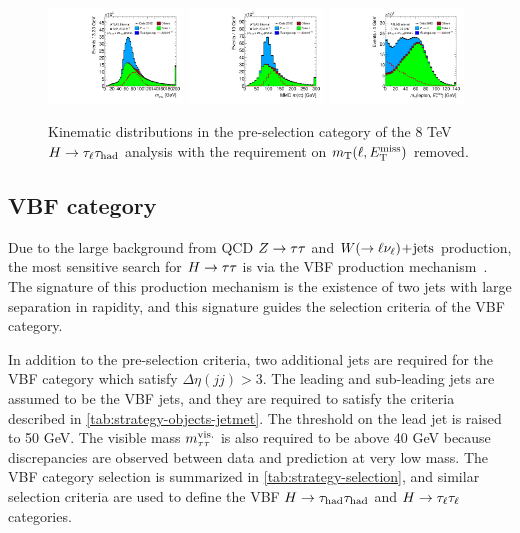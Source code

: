 \begin{figure}[tp]
  \includegraphics[width=0.32\textwidth]{figures/presel/mvis}
  \includegraphics[width=0.32\textwidth]{figures/presel/mMMC}
  \includegraphics[width=0.32\textwidth]{figures/presel/mT-hi} \\
  \caption{Kinematic distributions in the pre-selection category of the 8 TeV $H\rightarrow\tau_\ell\tau_\text{had}$ analysis with the requirement on $m_\text{T}(\ell, E_{\mathrm{T}}^{\mathrm{miss}})$ removed.}
  \label{fig:stategy-presel-2}
\end{figure}

\subsection{VBF category}
\label{sec:strategy-VBF}

Due to the large background from QCD $Z\rightarrow\tau\tau$ and $W (\rightarrow \ell\nu_\ell)\!+\!\text{jets}$ production, the most sensitive search for $H\rightarrow\tau\tau$ is via the VBF production mechanism~\cite{1998.vbfhtautau}. The signature of this production mechanism is the existence of two jets with large separation in rapidity, and this signature guides the selection criteria of the VBF category.

In addition to the pre-selection criteria, two additional jets are required for the VBF category which satisfy $\Delta\eta(jj) > 3$. The leading and sub-leading jets are assumed to be the VBF jets, and they are required to satisfy the criteria described in \cref{tab:strategy-objects-jetmet}. The threshold on the lead jet is raised to 50 GeV. The visible mass $m_{\tau\tau}^\text{vis.}$ is also required to be above 40 GeV because discrepancies are observed between data and prediction at very low mass. The VBF category selection is summarized in \cref{tab:strategy-selection}, and similar selection criteria are used to define the VBF $H\rightarrow\tau_\text{had}\tau_\text{had}$ and $H\rightarrow\tau_\ell\tau_\ell$ categories.

